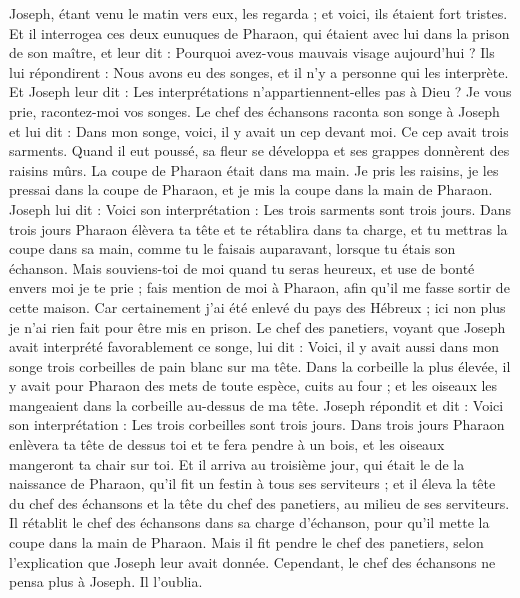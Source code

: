 \begin{multicols}{2}
Joseph, étant venu le matin vers eux, les regarda ; et voici, ils étaient fort tristes.
Et il interrogea ces deux eunuques de Pharaon, qui étaient avec lui dans la prison de son maître, et leur dit : Pourquoi avez-vous mauvais visage aujourd'hui ?
Ils lui répondirent : Nous avons eu des songes, et il n'y a personne qui les interprète. Et Joseph leur dit : Les interprétations n'appartiennent-elles pas à Dieu ? Je vous prie, racontez-moi vos songes.
Le chef des échansons raconta son songe à Joseph et lui dit : Dans mon songe, voici, il y avait un cep devant moi.
Ce cep avait trois sarments. Quand il eut poussé, sa fleur se développa et ses grappes donnèrent des raisins mûrs.
La coupe de Pharaon était dans ma main. Je pris les raisins, je les pressai dans la coupe de Pharaon, et je mis la coupe dans la main de Pharaon.
Joseph lui dit : Voici son interprétation : Les trois sarments sont trois jours.
Dans trois jours Pharaon élèvera ta tête et te rétablira dans ta charge, et tu mettras la coupe dans sa main, comme tu le faisais auparavant, lorsque tu étais son échanson.
Mais souviens-toi de moi quand tu seras heureux, et use de bonté envers moi je te prie ; fais mention de moi à Pharaon, afin qu'il me fasse sortir de cette maison.
Car certainement j'ai été enlevé du pays des Hébreux ; ici non plus je n'ai rien fait pour être mis en prison.
Le chef des panetiers, voyant que Joseph avait interprété favorablement ce songe, lui dit : Voici, il y avait aussi dans mon songe trois corbeilles de pain blanc sur ma tête.
Dans la corbeille la plus élevée, il y avait pour Pharaon des mets de toute espèce, cuits au four ; et les oiseaux les mangeaient dans la corbeille au-dessus de ma tête.
Joseph répondit et dit : Voici son interprétation : Les trois corbeilles sont trois jours.
Dans trois jours Pharaon enlèvera ta tête de dessus toi et te fera pendre à un bois, et les oiseaux mangeront ta chair sur toi.
Et il arriva au troisième jour, qui était le de la naissance de Pharaon, qu'il fit un festin à tous ses serviteurs ; et il éleva la tête du chef des échansons et la tête du chef des panetiers, au milieu de ses serviteurs.
Il rétablit le chef des échansons dans sa charge d'échanson, pour qu'il mette la coupe dans la main de Pharaon.
Mais il fit pendre le chef des panetiers, selon l'explication que Joseph leur avait donnée.
Cependant, le chef des échansons ne pensa plus à Joseph. Il l'oublia.

\end{multicols}
